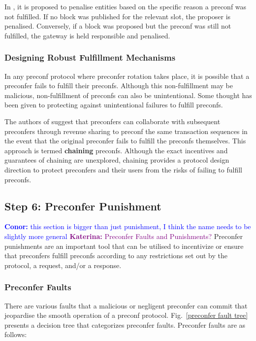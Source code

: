 \documentclass[a4paper]{article}
\theoremstyle{boldstyle}
\newcommand{\cm}[1]{\textcolor{blue}{\textbf{Conor:} #1}}
\newcommand{\dk}[1]{\textcolor{cyan}{\textbf{Demetris:} #1}}
\newcommand{\ks}[1]{\textcolor{purple}{\textbf{Katerina:} #1}}
\begin{document}
In \cite{gateway_trust_liveness}, it is proposed to penalise entities based on the specific reason a preconf was not fulfilled. If no block was published for the relevant slot, the proposer is penalised. Conversely, if a block was proposed but the preconf was still not fulfilled, the gateway is held responsible and penalised.


\subsubsection{Designing Robust Fulfillment Mechanisms}\label{robust_delivery}

    In any preconf protocol where preconfer rotation takes place, it is possible that a preconfer fails to fulfill their preconfs. Although this non-fulfillment may be malicious, non-fulfillment of preconfs can also be unintentional. Some thought has been given to protecting against unintentional failures to fulfill preconfs.
    
     The authors of \cite{W:AvoidingAccidentalLivenessFaultsforBasedPreconfs} suggest that preconfers can collaborate with subsequent preconfers through revenue sharing to preconf the same transaction sequences in the event that the original preconfer fails to fulfill the preconfs themselves. This approach is termed \textbf{chaining} preconfs. Although the exact incentives and guarantees of chaining are unexplored, chaining provides a protocol design direction to protect preconfers and their users from the risks of failing to fulfill preconfs. 
     
    
\subsection{Step 6: Preconfer Punishment} \label{preconfer_punishment}    
    \cm{this section is bigger than just punishment, I think the name needs to be slightly more general} \ks{Preconfer Faults and Punishments?}
    Preconfer punishments are an important tool that can be utilised to incentivize or ensure that preconfers fulfill preconfs according to any restrictions set out by the protocol, a request, and/or a response.
    
    \subsubsection{Preconfer Faults} \label{preconfer_faults_and_punishing_conditions}
    There are various faults that a malicious or negligent preconfer can commit that jeopardise the smooth operation of a preconf protocol. Fig.~\ref{preconfer fault tree} presents a decision tree that categorizes preconfer faults. Preconfer faults are as follows:
\end{document}
